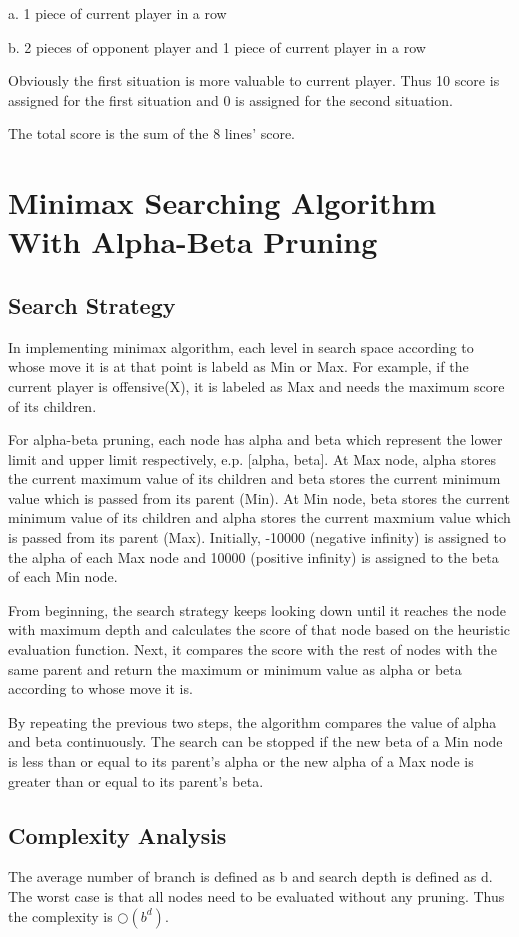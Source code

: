 \documentclass[titlepage]{article}
\begin{document}
a. 1 piece of current player in a row 

b. 2 pieces of opponent player and 1 piece of current player in a row 

Obviously the first situation is more valuable to current player. Thus 10
score is assigned for the first situation and 0 is assigned for the second
situation.

The total score is the sum of the 8 lines' score.

\section{Minimax Searching Algorithm With Alpha-Beta Pruning}
\label{sec:org12fcd22}
\subsection{Search Strategy}
\label{sec:org746fdbe}
In implementing minimax algorithm, each level in search space according to
whose move it is at that point is labeld as Min or Max. For example, if the
current player is offensive(X), it is labeled as Max and needs the maximum
score of its children.

For alpha-beta pruning, each node has alpha and beta which represent the
lower limit and upper limit respectively, e.p. [alpha, beta]. At Max node,
alpha stores the current maximum value of its children and beta stores the
current minimum value which is passed from its parent (Min). At Min node,
beta stores the current minimum value of its children and alpha stores the
current maxmium value which is passed from its parent (Max). Initially,
-10000 (negative infinity) is assigned to the alpha of each Max node and
10000 (positive infinity) is assigned to the beta of each Min node.

From beginning, the search strategy keeps looking down until it reaches the
node with maximum depth and calculates the score of that node based on the
heuristic evaluation function. Next, it compares the score with the rest of
nodes with the same parent and return the maximum or minimum value as alpha
or beta according to whose move it is.

By repeating the previous two steps, the algorithm compares the value of
alpha and beta continuously. The search can be stopped if the new beta of a
Min node is less than or equal to its parent's alpha or the new alpha of a
Max node is greater than or equal to its parent's beta.

\subsection{Complexity Analysis}
\label{sec:org34738a0}
The average number of branch is defined as b and search depth is defined as
d. The worst case is that all nodes need to be evaluated without any pruning.
Thus the complexity is \(\bigcirc(b^d)\). 
\end{document}
